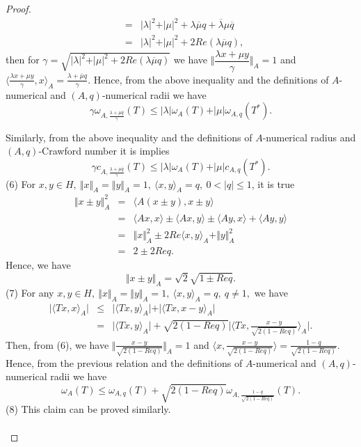 \documentclass[preprint,12pt,3p]{elsarticle}
\begin{document}
\begin{proof}
\begin{eqnarray}
& = & \vert \lambda \vert^{2}+\vert \mu \vert^{2}+\lambda \overline{\mu}q+\overline{\lambda}\mu\overline{q}\nonumber \\
& = & \vert \lambda \vert^{2}+\vert \mu \vert^{2}+2Re\left( \lambda \overline{\mu}q \right), \nonumber
\end{eqnarray}
then for $ \gamma =\sqrt{\vert \lambda\vert^{2}+ \vert \mu\vert^{2}+ 2Re (\lambda \overline{\mu} q)} $ we have   $
\Vert \dfrac{\lambda x+\mu y}{\gamma}  \Vert_{A}=1 $   and $
\langle \frac{\lambda x+\mu y }{\gamma},x \rangle_{A}=\frac{\lambda +\overline{\mu} q }{\gamma}.$
Hence, from the above inequality and the definitions of $ A$-numerical and $ (A,q)$-numerical radii we have
$$
\gamma \omega_{A,\frac{\lambda + \mu \overline{q}}{\gamma}} (T)\leq \vert \lambda\vert\omega_{A}(T)+\vert \mu\vert\omega_{A,q}(T^{*}).
$$

Similarly, from the above inequality and the definitions of $ A$-numerical radius and $ (A,q)$-Crawford number it is implies
$$
\gamma c_{A,\frac{\lambda + \mu \overline{q}}{\gamma} }(T)\leq \vert \lambda\vert\omega_{A}(T)+\vert \mu\vert c_{A,q}(T^{*}).
$$
(6) For $ x,y \in H, \ \Vert x \Vert_{A}=\Vert y \Vert_{A}=1, \ \langle x,y \rangle_{A}=q, \ 0<\vert q \vert \leq 1 $, it is true 
\begin{eqnarray}\label{INeq_2}
\Vert x\pm y \Vert^{2}_{A} & = & \langle A(x\pm y),x\pm y \rangle \nonumber \\
& = & \langle Ax,x \rangle \pm \langle Ax,y \rangle \pm \langle Ay,x \rangle + \langle Ay,y \rangle \nonumber \\
& = & \Vert x \Vert_{A}^{2}\pm 2 Re \langle x,y \rangle_{A}+ \Vert y \Vert_{A}^{2} \nonumber \\
& = & 2 \pm 2 Req. 
\end{eqnarray}
Hence, we have
$$
\Vert x\pm y \Vert_{A}=\sqrt{2}\sqrt{1\pm Req}.
$$
(7) For any $ x,y \in H, \ \Vert x \Vert_{A}=\Vert y \Vert_{A}=1, \  \langle x,y \rangle_{A}=q, \ q\neq 1, $ we have 
\begin{eqnarray}
\vert \langle Tx,x\rangle_{A} \vert & \leq & \vert \langle Tx,y\rangle_{A} \vert +  \vert \langle Tx,x-y\rangle_{A} \vert \nonumber \\
& = & \vert \langle Tx,y\rangle_{A} \vert + \sqrt{2(1-Req)}\vert \langle Tx,\frac{x-y}{\sqrt{2(1-Req)}}\rangle_{A} \vert . \nonumber 
\end{eqnarray}
Then, from (6), we have $ \Vert \frac{x-y}{\sqrt{2(1-Req)}} \Vert_{A}=1 $ and $ \langle x, \frac{x-y}{\sqrt{2(1-Req)}} \rangle =\frac{1-q}{\sqrt{2(1-Req)}}. $
Hence, from the previous relation and the definitions of $ A$-numerical and $ (A,q)$-numerical radii we have
$$
\omega_{A}(T)\leq \omega_{A, q}(T)+ \sqrt{2(1-Req)}\omega_{A,\frac{1-q}{\sqrt{2(1-Req)}}}(T).
$$
(8) This claim can be proved similarly. \\ \\
  \end{proof}
\end{document}
